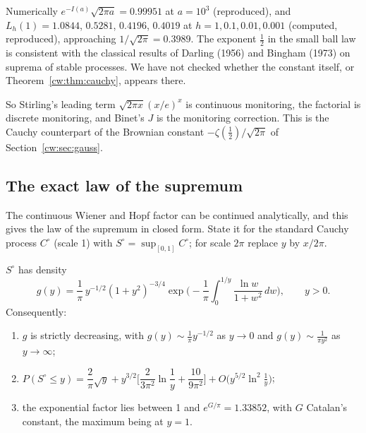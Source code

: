 Numerically $e^{-I(a)}\sqrt{2\pi a}=0.99951$ at $a=10^3$ (reproduced), and $L_h(1)=1.0844$, $0.5281$, $0.4196$, $0.4019$ at $h=1,0.1,0.01,0.001$ (computed, reproduced), approaching $1/\sqrt{2\pi}=0.3989$.
The exponent $\frac12$ in the small ball law is consistent with the classical results of Darling (1956) and Bingham (1973) on suprema of stable processes. We have not checked whether the constant itself, or Theorem~\ref{cw:thm:cauchy}, appears there.

So Stirling's leading term $\sqrt{2\pi x}(x/e)^x$ is continuous monitoring, the factorial is discrete monitoring, and Binet's $J$ is the monitoring correction. This is the Cauchy counterpart of the Brownian constant $-\zeta(\tfrac12)/\sqrt{2\pi}$ of Section~\ref{cw:sec:gauss}.

\subsection{The exact law of the supremum}\label{cw:sec:darling}
The continuous Wiener and Hopf factor can be continued analytically, and this gives the law of the supremum in closed form. State it for the standard Cauchy process $C^\circ$ (scale 1) with $S^\circ=\sup_{[0,1]}C^\circ$; for scale $2\pi$ replace $y$ by $x/2\pi$.

\begin{theorem}[proved]\label{cw:thm:darling}
$S^\circ$ has density
\[
g(y)=\frac1\pi\,y^{-1/2}(1+y^2)^{-3/4}\exp\Big(-\frac1\pi\int_0^{1/y}\frac{\ln w}{1+w^2}\,dw\Big),\qquad y>0 .
\]
Consequently:
\begin{enumerate}
\item $g$ is strictly decreasing, with $g(y)\sim\frac1\pi y^{-1/2}$ as $y\to0$ and $g(y)\sim\frac1{\pi y^2}$ as $y\to\infty$;
\item $P(S^\circ\le y)=\dfrac2\pi\sqrt y+y^{3/2}\Big[\dfrac2{3\pi^2}\ln\dfrac1y+\dfrac{10}{9\pi^2}\Big]+O\big(y^{5/2}\ln^2\tfrac1y\big)$;
\item the exponential factor lies between 1 and $e^{G/\pi}=1.33852$, with $G$ Catalan's constant, the maximum being at $y=1$.
\end{enumerate}
\end{theorem}

